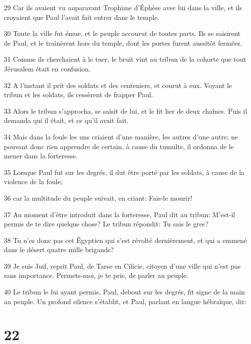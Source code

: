 \par 29 Car ils avaient vu auparavant Trophime d'Éphèse avec lui dans la ville, et ils croyaient que Paul l'avait fait entrer dans le temple.
\par 30 Toute la ville fut émue, et le peuple accourut de toutes parts. Ils se saisirent de Paul, et le traînèrent hors du temple, dont les portes furent aussitôt fermées.
\par 31 Comme ils cherchaient à le tuer, le bruit vint au tribun de la cohorte que tout Jérusalem était en confusion.
\par 32 A l'instant il prit des soldats et des centeniers, et courut à eux. Voyant le tribun et les soldats, ils cessèrent de frapper Paul.
\par 33 Alors le tribun s'approcha, se saisit de lui, et le fit lier de deux chaînes. Puis il demanda qui il était, et ce qu'il avait fait.
\par 34 Mais dans la foule les uns criaient d'une manière, les autres d'une autre; ne pouvant donc rien apprendre de certain, à cause du tumulte, il ordonna de le mener dans la forteresse.
\par 35 Lorsque Paul fut sur les degrés, il dut être porté par les soldats, à cause de la violence de la foule;
\par 36 car la multitude du peuple suivait, en criant: Fais-le mourir!
\par 37 Au moment d'être introduit dans la forteresse, Paul dit au tribun: M'est-il permis de te dire quelque chose? Le tribun répondit: Tu sais le grec?
\par 38 Tu n'es donc pas cet Égyptien qui s'est révolté dernièrement, et qui a emmené dans le désert quatre mille brigands?
\par 39 Je suis Juif, reprit Paul, de Tarse en Cilicie, citoyen d'une ville qui n'est pas sans importance. Permets-moi, je te prie, de parler au peuple.
\par 40 Le tribun le lui ayant permis, Paul, debout sur les degrés, fit signe de la main au peuple. Un profond silence s'établit, et Paul, parlant en langue hébraïque, dit:

\chapter{22}

